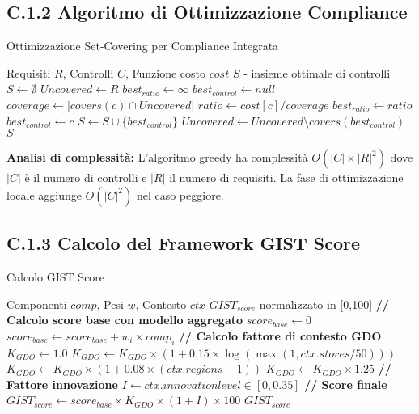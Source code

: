 \subsection{\texorpdfstring{\textbf{C.1.2 Algoritmo di Ottimizzazione Compliance}}{C.1.2 - Algoritmo di Ottimizzazione Compliance}}

\begin{algorithm}
\caption{Ottimizzazione Set-Covering per Compliance Integrata}
\label{alg:compliance}
\begin{algorithmic}
\Require Requisiti $R$, Controlli $C$, Funzione costo $cost$
\Ensure $S$ - insieme ottimale di controlli
\State $S \gets \emptyset$
\State $Uncovered \gets R$
    \State $best_{ratio} \gets \infty$
    \State $best_{control} \gets null$
        \State $coverage \gets |covers(c) \cap Uncovered|$
            \State $ratio \gets cost[c] / coverage$
                \State $best_{ratio} \gets ratio$
                \State $best_{control} \gets c$
            \EndIf
        \EndIf
    \EndFor
    \State $S \gets S \cup \{best_{control}\}$
    \State $Uncovered \gets Uncovered \setminus covers(best_{control})$
\EndWhile
\State \Return $S$
\end{algorithmic}
\end{algorithm}

\textbf{Analisi di complessità:} L'algoritmo greedy ha complessità $O(|C| \times |R|^2)$ dove $|C|$ è il numero di controlli e $|R|$ il numero di requisiti. La fase di ottimizzazione locale aggiunge $O(|C|^2)$ nel caso peggiore.

\subsection{\texorpdfstring{\textbf{C.1.3 Calcolo del Framework GIST Score}}{C.1.3 - Calcolo del Framework GIST Score}}

\begin{algorithm}
\caption{Calcolo GIST Score}
\label{alg:gist}
\begin{algorithmic}
\Require Componenti $comp$, Pesi $w$, Contesto $ctx$
\Ensure $GIST_{score}$ normalizzato in [0,100]
\State \textbf{// Calcolo score base con modello aggregato}
\State $score_{base} \gets 0$
    \State $score_{base} \gets score_{base} + w_i \times comp_i$
\EndFor
\State \textbf{// Calcolo fattore di contesto GDO}
\State $K_{GDO} \gets 1.0$
\State $K_{GDO} \gets K_{GDO} \times (1 + 0.15 \times \log(\max(1, ctx.stores/50)))$
\State $K_{GDO} \gets K_{GDO} \times (1 + 0.08 \times (ctx.regions - 1))$
\State $K_{GDO} \gets K_{GDO} \times 1.25$ 
\State \textbf{// Fattore innovazione}
\State $I \gets ctx.innovation\mathit{level} \in [0, 0.35]$
\State \textbf{// Score finale}
\State $GIST_{score} \gets score_{base} \times K_{GDO} \times (1 + I) \times 100$
\State \Return $GIST_{score}$
\end{algorithmic}
\end{algorithm}

